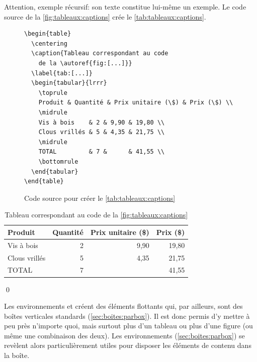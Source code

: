 \begin{exemple}
  Attention, exemple récursif: son texte constitue lui-même un
  exemple. Le code source de la \autoref{fig:tableaux:captions} crée
  le \autoref{tab:tableaux:captions}.
  \begin{figure}
\begin{lstlisting}
\begin{table}
  \centering
  \caption{Tableau correspondant au code
    de la \autoref{fig:[...]}}
  \label{tab:[...]}
  \begin{tabular}{lrrr}
    \toprule
    Produit & Quantité & Prix unitaire (\$) & Prix (\$) \\
    \midrule
    Vis à bois    & 2 & 9,90 & 19,80 \\
    Clous vrillés & 5 & 4,35 & 21,75 \\
    \midrule
    TOTAL         & 7 &      & 41,55 \\
    \bottomrule
  \end{tabular}
\end{table}
\end{lstlisting}
    \caption{Code source pour créer le \autoref{tab:tableaux:captions}}
    \label{fig:tableaux:captions}
  \end{figure}
  \begin{table}
    \centering
    \caption{Tableau correspondant au code de la \autoref{fig:tableaux:captions}}
    \label{tab:tableaux:captions}
    \begin{tabular}{lrrr}
      \toprule
      Produit & Quantité & Prix unitaire (\$) & Prix (\$) \\
      \midrule
      Vis à bois    & 2 & 9,90 & 19,80 \\
      Clous vrillés & 5 & 4,35 & 21,75 \\
      \midrule
      TOTAL         & 7 &      & 41,55 \\
      \bottomrule
    \end{tabular}
  \end{table}
  \qed
\end{exemple}

Les environnements  et  créent des éléments
flottants qui, par ailleurs, sont des boîtes verticales standards
(\autoref{sec:boites:parbox}). Il est donc permis d'y mettre à peu
près n'importe quoi, mais surtout plus d'un tableau ou plus d'une
figure (ou même une combinaison des deux). Les environnements
 (\autoref{sec:boites:parbox}) se revèlent alors
particulièrement utiles pour disposer les éléments de contenu dans la
boîte.

